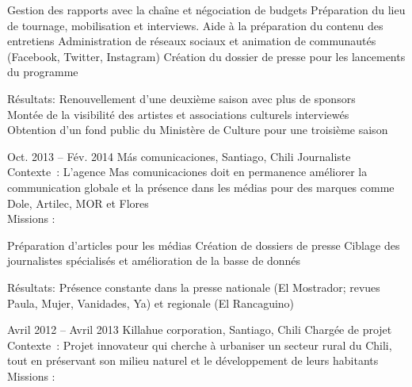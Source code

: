 \documentclass[30pt, french]{tccv}
\begin{document}
\begin{upshape}
\begin{textblock}{13}
\begin{mdframed}
\begin{eventlist}
    \setlength{\parskip}{-10pt}
    \begin{itemize}
      \setlength\itemsep{-3pt} 
      \cvitem[\checkmark] Gestion des rapports avec la chaîne et négociation de budgets                       
      \cvitem[\checkmark] Préparation du lieu de tournage, mobilisation et interviews. Aide à la préparation du contenu des entretiens 
      \cvitem[\checkmark] Administration de réseaux sociaux et animation de communautés (Facebook, Twitter, Instagram)                 
      \cvitem[\checkmark] Création du dossier de presse pour les lancements du programme                                               
    \end{itemize}     
Résultats: Renouvellement d'une deuxième saison avec plus de sponsors \\
Montée de la visibilité des artistes et associations culturels interviewés \\
Obtention d’un fond public du Ministère de Culture pour une troisième saison  \\


\setlength{\parskip}{0pt}    
\item{Oct. 2013 -- Fév. 2014 }     
  {Más comunicaciones, Santiago, Chili}     
  {Journaliste}
     \fontsize{9pt}{1em}\color{text}\bodyfontlight\upshape\selectfont
Contexte : L’agence Mas comunicaciones doit en permanence améliorer la communication globale et la présence dans les médias
pour des marques comme Dole, Artilec, MOR et Flores\\
Missions :

\setlength{\parskip}{-10pt}
\begin{itemize}
      \setlength\itemsep{-3pt} 
      \cvitem[\checkmark]  Préparation d'articles pour les médias                                            
      \cvitem[\checkmark]  Création de dossiers de presse                                                     
      \cvitem[\checkmark]  Ciblage des journalistes spécialisés et amélioration de la basse de donnés  
\end{itemize}       
Résultats: Présence constante dans la presse nationale (El Mostrador; revues Paula, Mujer, Vanidades, Ya) et regionale (El Rancaguino) 

\setlength{\parskip}{0pt}
\item{Avril 2012 -- Avril 2013 }     
  {Killahue corporation, Santiago, Chili}     
  {Chargée de projet}
\fontsize{9pt}{1em}\color{text}\bodyfontlight\upshape\selectfont
Contexte : Projet innovateur qui cherche à urbaniser un secteur rural du Chili, tout en préservant son milieu naturel et le développement de leurs habitants \\
Missions :
     

\end{eventlist}
\end{mdframed}
\end{textblock}
\end{upshape}
\end{document}

